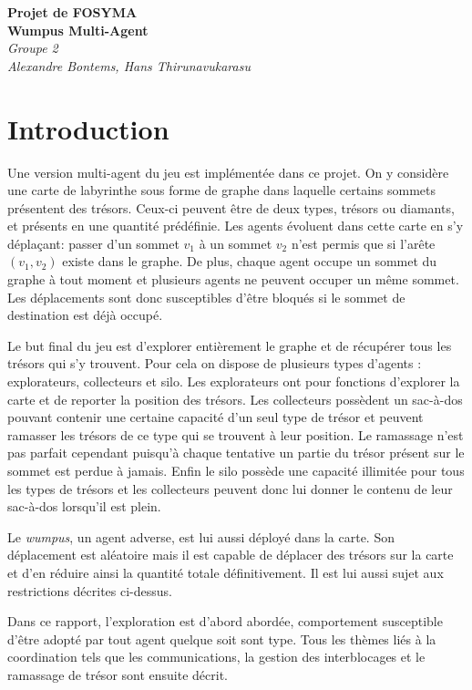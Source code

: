 \documentclass[11pt]{article}
\begin{document}
	
\begin{center}
	\textbf{Projet de FOSYMA\\[.5cm]Wumpus Multi-Agent}\\[.5cm]
	\textit{Groupe 2}\\
	\textit{Alexandre Bontems, Hans Thirunavukarasu}\\
\end{center}

\tableofcontents
\section{Introduction}
Une version multi-agent du jeu  est implémentée dans ce projet. On y considère une carte de labyrinthe sous forme de graphe dans laquelle certains sommets présentent des trésors. Ceux-ci peuvent être de deux types, trésors ou diamants, et présents en une quantité prédéfinie. Les agents évoluent dans cette carte en s'y déplaçant: passer d'un sommet $v_1$ à un sommet $v_2$ n'est permis que si l'arête $(v_1, v_2)$ existe dans le graphe. De plus, chaque agent occupe un sommet du graphe à tout moment et plusieurs agents ne peuvent occuper un même sommet. Les déplacements sont donc susceptibles d'être bloqués si le sommet de destination est déjà occupé.

Le but final du jeu est d'explorer entièrement le graphe et de récupérer tous les trésors qui s'y trouvent. Pour cela on dispose de plusieurs types d'agents : explorateurs, collecteurs et silo. Les explorateurs ont pour fonctions d'explorer la carte et de reporter la position des trésors. Les collecteurs possèdent un sac-à-dos pouvant contenir une certaine capacité d'un seul type de trésor et peuvent ramasser les trésors de ce type qui se trouvent à leur position. Le ramassage n'est pas parfait cependant puisqu'à chaque tentative un partie du trésor présent sur le sommet est perdue à jamais. Enfin le silo possède une capacité illimitée pour tous les types de trésors et les collecteurs peuvent donc lui donner le contenu de leur sac-à-dos lorsqu'il est plein.

Le \textit{wumpus}, un agent adverse, est lui aussi déployé dans la carte. Son déplacement est aléatoire mais il est capable de déplacer des trésors sur la carte et d'en réduire ainsi la quantité totale définitivement. Il est lui aussi sujet aux restrictions décrites ci-dessus.

Dans ce rapport, l'exploration est d'abord abordée, comportement susceptible d'être adopté par tout agent quelque soit sont type. Tous les thèmes liés à la coordination tels que les communications, la gestion des interblocages et le ramassage de trésor sont ensuite décrit.
\end{document}
